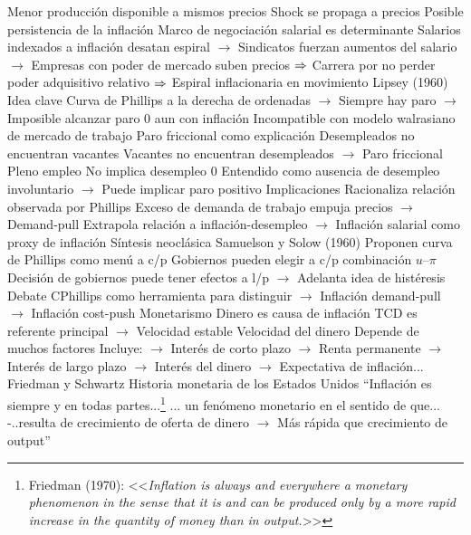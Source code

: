 \documentclass{nuevotema}
\begin{document}
\begin{esquemal}
				\4[] Menor producción disponible a mismos precios
				\4 Shock se propaga a precios
				\4 Posible persistencia de la inflación
				\4[] Marco de negociación salarial es determinante
				\4[] Salarios indexados a inflación desatan espiral
				\4[] $\to$ Sindicatos fuerzan aumentos del salario
				\4[] $\to$ Empresas con poder de mercado suben precios
				\4[] $\Rightarrow$ Carrera por no perder poder adquisitivo relativo
				\4[] $\Rightarrow$ Espiral inflacionaria en movimiento
			\3 Lipsey (1960)
				\4 Idea clave
				\4[] Curva de Phillips a la derecha de ordenadas
				\4[] $\to$ Siempre hay paro
				\4[] $\to$ Imposible alcanzar paro 0 aun con inflación
				\4[] Incompatible con modelo walrasiano de mercado de trabajo
				\4 Paro friccional como explicación
				\4[] Desempleados no encuentran vacantes
				\4[] Vacantes no encuentran desempleados
				\4[] $\to$ Paro friccional
				\4 Pleno empleo
				\4[] No implica desempleo 0
				\4[] Entendido como ausencia de desempleo involuntario
				\4[] $\to$ Puede implicar paro positivo
				\4 Implicaciones
				\4[] Racionaliza relación observada por Phillips
				\4[] Exceso de demanda de trabajo empuja precios
				\4[] $\to$ Demand-pull
				\4[] Extrapola relación a inflación-desempleo
				\4[] $\to$ Inflación salarial como proxy de inflación
			\3 Síntesis neoclásica
				\4 Samuelson y Solow (1960)
				\4[] Proponen curva de Phillips como menú a c/p
				\4[] Gobiernos pueden elegir a c/p combinación $u$--$\pi$
				\4[] Decisión de gobiernos puede tener efectos a l/p
				\4[] $\to$ Adelanta idea de histéresis
				\4[] Debate CPhillips como herramienta para distinguir
				\4[] $\to$ Inflación demand-pull
				\4[] $\to$ Inflación cost-push
			\3 Monetarismo
				\4 Dinero es causa de inflación
				\4[] TCD es referente principal
				\4[] $\to$ Velocidad estable
				\4 Velocidad del dinero
				\4[] Depende de muchos factores
				\4[] Incluye:
				\4[] $\to$ Interés de corto plazo
				\4[] $\to$ Renta permanente
				\4[] $\to$ Interés de largo plazo
				\4[] $\to$ Interés del dinero
				\4[] $\to$ Expectativa de inflación...
				\4 Friedman y Schwartz
				\4[] Historia monetaria de los Estados Unidos
				\4[] ``Inflación es siempre y en todas partes...\footnote{Friedman (1970): <<\textit{Inflation is always and everywhere a monetary phenomenon in the sense that it is and can be produced only by a more rapid increase in the quantity of money than in output.}>> }
				\4[] ... un fenómeno monetario en el sentido de que...
				\4[] -..resulta de crecimiento de oferta de dinero
				\4[] $\to$ Más rápida que crecimiento de output''

\end{esquemal}
\end{document}
